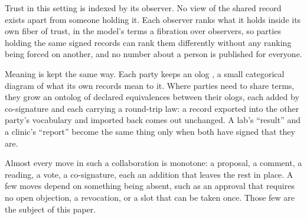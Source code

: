 Trust in this setting is indexed by its observer. No view of the shared record exists apart from
someone holding it. Each observer ranks what it holds inside its own fiber of trust, in the model's
terms a fibration over observers, so parties holding the same signed records can rank them
differently without any ranking being forced on another, and no number about a person is published
for everyone.

Meaning is kept the same way. Each party keeps an olog \citep{spivak2012}, a small categorical
diagram of what its own records mean to it. Where parties need to share terms, they grow an ontolog
of declared equivalences between their ologs, each added by co-signature and each carrying a
round-trip law: a record exported into the other party's vocabulary and imported back comes out
unchanged. A lab's ``result'' and a clinic's ``report'' become the same thing only when both have
signed that they are.

Almost every move in such a collaboration is monotone: a proposal, a comment, a reading, a vote, a
co-signature, each an addition that leaves the rest in place. A few moves depend on something being
absent, such as an approval that requires no open objection, a revocation, or a slot that can be
taken once. Those few are the subject of this paper.
